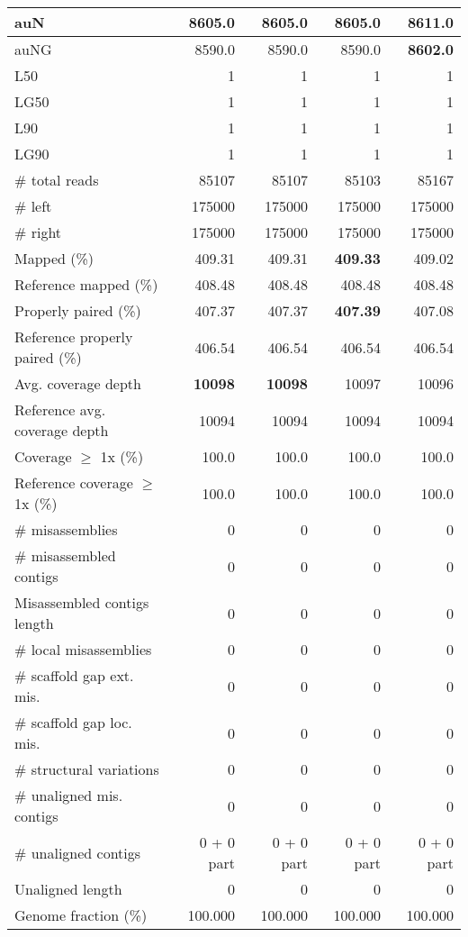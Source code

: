 \documentclass[12pt,a4paper]{article}
\begin{document}
\begin{table}[ht]
\begin{center}
\begin{tabular}{|l*{4}{|r}|}
auN & 8605.0 & 8605.0 & 8605.0 & {\bf 8611.0} \\ \hline
auNG & 8590.0 & 8590.0 & 8590.0 & {\bf 8602.0} \\ \hline
L50 & 1 & 1 & 1 & 1 \\ \hline
LG50 & 1 & 1 & 1 & 1 \\ \hline
L90 & 1 & 1 & 1 & 1 \\ \hline
LG90 & 1 & 1 & 1 & 1 \\ \hline
\# total reads & 85107 & 85107 & 85103 & 85167 \\ \hline
\# left & 175000 & 175000 & 175000 & 175000 \\ \hline
\# right & 175000 & 175000 & 175000 & 175000 \\ \hline
Mapped (\%) & 409.31 & 409.31 & {\bf 409.33} & 409.02 \\ \hline
Reference mapped (\%) & 408.48 & 408.48 & 408.48 & 408.48 \\ \hline
Properly paired (\%) & 407.37 & 407.37 & {\bf 407.39} & 407.08 \\ \hline
Reference properly paired (\%) & 406.54 & 406.54 & 406.54 & 406.54 \\ \hline
Avg. coverage depth & {\bf 10098} & {\bf 10098} & 10097 & 10096 \\ \hline
Reference avg. coverage depth & 10094 & 10094 & 10094 & 10094 \\ \hline
Coverage $\geq$ 1x (\%) & 100.0 & 100.0 & 100.0 & 100.0 \\ \hline
Reference coverage $\geq$ 1x (\%) & 100.0 & 100.0 & 100.0 & 100.0 \\ \hline
\# misassemblies & 0 & 0 & 0 & 0 \\ \hline
\# misassembled contigs & 0 & 0 & 0 & 0 \\ \hline
Misassembled contigs length & 0 & 0 & 0 & 0 \\ \hline
\# local misassemblies & 0 & 0 & 0 & 0 \\ \hline
\# scaffold gap ext. mis. & 0 & 0 & 0 & 0 \\ \hline
\# scaffold gap loc. mis. & 0 & 0 & 0 & 0 \\ \hline
\# structural variations & 0 & 0 & 0 & 0 \\ \hline
\# unaligned mis. contigs & 0 & 0 & 0 & 0 \\ \hline
\# unaligned contigs & 0 + 0 part & 0 + 0 part & 0 + 0 part & 0 + 0 part \\ \hline
Unaligned length & 0 & 0 & 0 & 0 \\ \hline
Genome fraction (\%) & 100.000 & 100.000 & 100.000 & 100.000 \\ \hline

\end{tabular}
\end{center}
\end{table}
\end{document}
